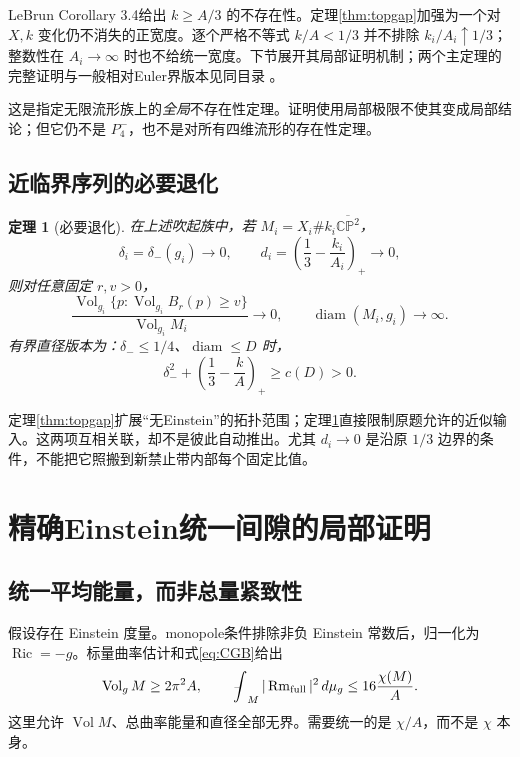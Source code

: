 \documentclass[UTF8,a4paper,11pt,fontset=fandol]{ctexart}
\numberwithin{equation}{section}
\newtheorem{theorem}{定理}[section]
\theoremstyle{definition}
\newcommand{\Ric}{\operatorname{Ric}}
\newcommand{\Rm}{\operatorname{Rm}}
\newcommand{\Vol}{\operatorname{Vol}}
\newcommand{\diam}{\operatorname{diam}}
\newcommand{\CP}{\mathbb{CP}}
\newcommand{\dd}{\,d\mu_g}
\newcommand{\fint}{\mathop{\rlap{\,\raisebox{0.1ex}{\tiny$-$}}\int}\nolimits}
\begin{document}
LeBrun Corollary 3.4给出 $k\ge A/3$ 的不存在性\cite{LeBrun2001}。定理\ref{thm:topgap}加强为一个对 $X,k$ 变化仍不消失的正宽度。逐个严格不等式 $k/A<1/3$ 并不排除 $k_i/A_i\uparrow1/3$；整数性在 $A_i\to\infty$ 时也不给统一宽度。下节展开其局部证明机制；两个主定理的完整证明与一般相对Euler界版本见同目录 。

这是指定无限流形族上的\emph{全局}不存在性定理。证明使用局部极限不使其变成局部结论；但它仍不是 $P_4^-$，也不是对所有四维流形的存在性定理。

\subsection{近临界序列的必要退化}
\begin{theorem}[必要退化]\label{thm:collapse}
在上述吹起族中，若 $M_i=X_i\#k_i\overline{\CP^2}$，
\[
\delta_i=\delta_-(g_i)\longrightarrow0,
\qquad d_i=\left(\frac13-\frac{k_i}{A_i}\right)_+\longrightarrow0,
\]
则对任意固定 $r,v>0$，
\begin{equation}\label{eq:measurecollapse}
\frac{\Vol_{g_i}\{p:\Vol_{g_i}B_r(p)\ge v\}}
{\Vol_{g_i}M_i}\longrightarrow0,
\qquad \diam(M_i,g_i)\longrightarrow\infty.
\end{equation}
有界直径版本为：$\delta_-\le1/4$、$\diam\le D$ 时，
\begin{equation}\label{eq:diambound}
\delta_-^2+\left(\frac13-\frac{k}{A}\right)_+\ge c(D)>0.
\end{equation}
\end{theorem}

定理\ref{thm:topgap}扩展“无Einstein”的拓扑范围；定理\ref{thm:collapse}直接限制原题允许的近似输入。这两项互相关联，却不是彼此自动推出。尤其 $d_i\to0$ 是沿原 $1/3$ 边界的条件，不能把它照搬到新禁止带内部每个固定比值。

\section{精确Einstein统一间隙的局部证明}
\subsection{统一平均能量，而非总量紧致性}
假设存在 Einstein 度量。monopole条件排除非负 Einstein 常数后，归一化为 $\Ric=-g$。标量曲率估计和式\eqref{eq:CGB}给出
\begin{equation}\label{eq:budget}
 \Vol_gM\ge2\pi^2A,
 \qquad \fint_M|\Rm_{\rm full}|^2\dd
 \le16\frac{\chi(M)}A.
\end{equation}
这里允许 $\Vol M$、总曲率能量和直径全部无界。需要统一的是 $\chi/A$，而不是 $\chi$ 本身。
\end{document}
